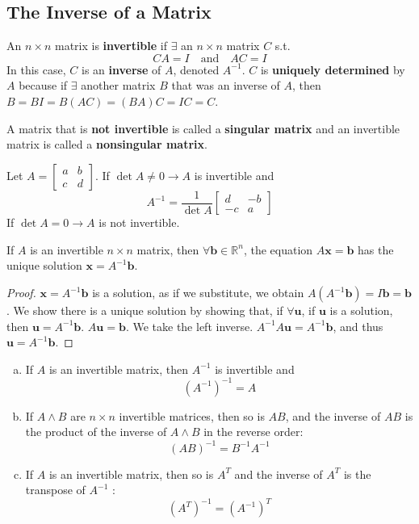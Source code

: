 \documentclass[11pt]{scrartcl}
\theoremstyle{dotlessP}
\theoremstyle{dotlessN}
\newcommand{\reals}{\mathbb{R}} %
\begin{document}
\subsection{The Inverse of a Matrix}
\begin{definition}
	An $n\times n$ matrix is \textbf{invertible} if $\exists$ an $n \times n$ matrix $C$ s.t. 
	\[
		CA = I \quad \text{and} \quad AC = I
	\] 
	In this case, $C$ is an \textbf{inverse} of $A$, denoted $A^{-1}$. $C$ is \textbf{uniquely determined} by $A$ because if $\exists$ another matrix $B$ that was an inverse of $A$, then $B = BI = B(AC) = (BA)C = IC = C$.

	A matrix that is \textbf{not invertible} is called a \textbf{singular matrix} and an invertible matrix is called a \textbf{nonsingular matrix}.
\end{definition}
\begin{theorem}
	Let $A =
\begin{bmatrix}
	a & b \\
	c & d
\end{bmatrix}
	$. If $\det A \neq 0 \to A$ is invertible and
	\[
		A^{-1} = 
		\frac{1}{\det A}
		\begin{bmatrix}
			d & -b \\
			-c & a
		\end{bmatrix}
	\] 
	If $\det A = 0 \to A$ is not invertible.
\end{theorem}
\begin{theorem}
	If $A$ is an invertible $n \times n$ matrix, then $\forall \bm{b} \in \reals^n$, the equation $A\bm{x} = \bm{b}$ has the unique solution  $\bm{x} = A^{-1}\bm{b}$.
\end{theorem}
\begin{proof}
	$\bm{x} = A^{-1}\bm{b}$ is a solution, as if we substitute, we obtain $A(A^{-1}\bm{b}) = I\bm{b} = \bm{b}$. We show there is a unique solution by showing that, if $\forall \bm{u}$, if $\bm{u}$ is a solution, then $\bm{u} = A^{-1}\bm{b}$. $A\bm{u} = \bm{b}$. We take the left inverse. $A^{-1}A\bm{u} = A^{-1}\bm{b}$, and thus $\bm{u} = A^{-1}\bm{b}$.
\end{proof}
\begin{theorem}
	\begin{enumerate}[a.]
		\item If $A$ is an invertible matrix, then $A^{-1}$ is invertible and
			\[
				(A^{-1})^{-1} = A
			\] 
		\item If $A \land B$ are $n \times n$ invertible matrices, then so is $AB$, and the inverse of $AB$ is the product of the inverse of $A \land B$ in the reverse order:
			\[
				(AB)^{-1} = B^{-1}A^{-1}
			\] 
		\item If $A$ is an invertible matrix, then so is $A^T$ and the inverse of $A^T$ is the transpose of $A^{-1}$ :
			\[
				(A^T)^{-1} = (A^{-1})^T
			\] 
	\end{enumerate}
\end{theorem}
\end{document}
